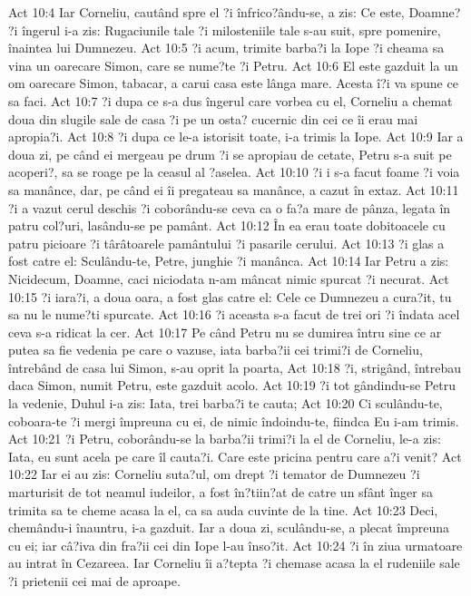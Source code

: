 Act 10:4  Iar Corneliu, cautând spre el ?i înfrico?ându-se, a zis: Ce este, Doamne? ?i îngerul i-a zis: Rugaciunile tale ?i milosteniile tale s-au suit, spre pomenire, înaintea lui Dumnezeu.
Act 10:5  ?i acum, trimite barba?i la Iope ?i cheama sa vina un oarecare Simon, care se nume?te ?i Petru.
Act 10:6  El este gazduit la un om oarecare Simon, tabacar, a carui casa este lânga mare. Acesta î?i va spune ce sa faci.
Act 10:7  ?i dupa ce s-a dus îngerul care vorbea cu el, Corneliu a chemat doua din slugile sale de casa ?i pe un osta? cucernic din cei ce îi erau mai apropia?i.
Act 10:8  ?i dupa ce le-a istorisit toate, i-a trimis la Iope.
Act 10:9  Iar a doua zi, pe când ei mergeau pe drum ?i se apropiau de cetate, Petru s-a suit pe acoperi?, sa se roage pe la ceasul al ?aselea.
Act 10:10  ?i i s-a facut foame ?i voia sa manânce, dar, pe când ei îi pregateau sa manânce, a cazut în extaz.
Act 10:11  ?i a vazut cerul deschis ?i coborându-se ceva ca o fa?a mare de pânza, legata în patru col?uri, lasându-se pe pamânt.
Act 10:12  În ea erau toate dobitoacele cu patru picioare ?i târâtoarele pamântului ?i pasarile cerului.
Act 10:13  ?i glas a fost catre el: Sculându-te, Petre, junghie ?i manânca.
Act 10:14  Iar Petru a zis: Nicidecum, Doamne, caci niciodata n-am mâncat nimic spurcat ?i necurat.
Act 10:15  ?i iara?i, a doua oara, a fost glas catre el: Cele ce Dumnezeu a cura?it, tu sa nu le nume?ti spurcate.
Act 10:16  ?i aceasta s-a facut de trei ori ?i îndata acel ceva s-a ridicat la cer.
Act 10:17  Pe când Petru nu se dumirea întru sine ce ar putea sa fie vedenia pe care o vazuse, iata barba?ii cei trimi?i de Corneliu, întrebând de casa lui Simon, s-au oprit la poarta,
Act 10:18  ?i, strigând, întrebau daca Simon, numit Petru, este gazduit acolo.
Act 10:19  ?i tot gândindu-se Petru la vedenie, Duhul i-a zis: Iata, trei barba?i te cauta;
Act 10:20  Ci sculându-te, coboara-te ?i mergi împreuna cu ei, de nimic îndoindu-te, fiindca Eu i-am trimis.
Act 10:21  ?i Petru, coborându-se la barba?ii trimi?i la el de Corneliu, le-a zis: Iata, eu sunt acela pe care îl cauta?i. Care este pricina pentru care a?i venit?
Act 10:22  Iar ei au zis: Corneliu suta?ul, om drept ?i temator de Dumnezeu ?i marturisit de tot neamul iudeilor, a fost în?tiin?at de catre un sfânt înger sa trimita sa te cheme acasa la el, ca sa auda cuvinte de la tine.
Act 10:23  Deci, chemându-i înauntru, i-a gazduit. Iar a doua zi, sculându-se, a plecat împreuna cu ei; iar câ?iva din fra?ii cei din Iope l-au înso?it.
Act 10:24  ?i în ziua urmatoare au intrat în Cezareea. Iar Corneliu îi a?tepta ?i chemase acasa la el rudeniile sale ?i prietenii cei mai de aproape.
